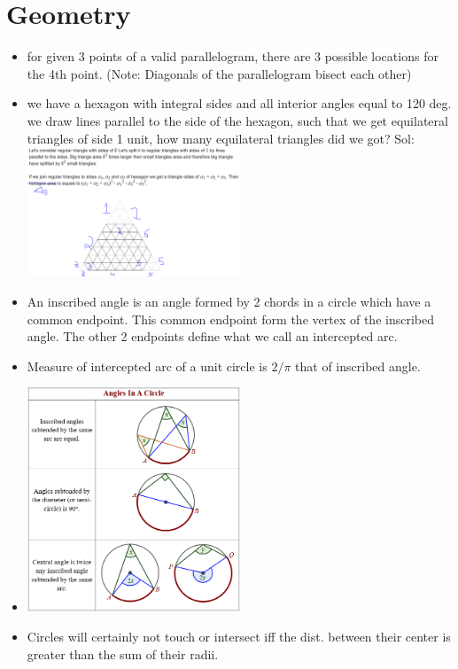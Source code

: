\documentclass[8pt, a4paper, oneside, twocolumn]{extarticle}
\begin{document}
\section{Geometry}
\begin{itemize}
    \item for given 3 points of a valid parallelogram, there are 3 possible locations for the 4th point. (Note: Diagonals of the parallelogram bisect each other)
    \item we have a hexagon with integral sides and all interior angles equal to 120 deg. we draw lines parallel to the side of the hexagon, such that we get equilateral triangles of side 1 unit, how many equilateral triangles did we got? Sol: \includegraphics[width=0.5\textwidth,height=0.5\textheight,keepaspectratio]{assets/triangle} 
    \item An inscribed angle is an angle formed by 2 chords in a circle which have a common endpoint. This common endpoint form the vertex of the inscribed angle. The other 2 endpoints define what we call an intercepted arc.
    \item Measure of intercepted arc of a unit circle is $2/\pi$ that of inscribed angle.
    \item \includegraphics[width=0.5\textwidth,height=0.5\textheight,keepaspectratio]{assets/basiccircle} 
    \item Circles will certainly not touch or intersect iff the dist. between their center is greater than the sum of their radii.

\end{itemize}
\end{document}
